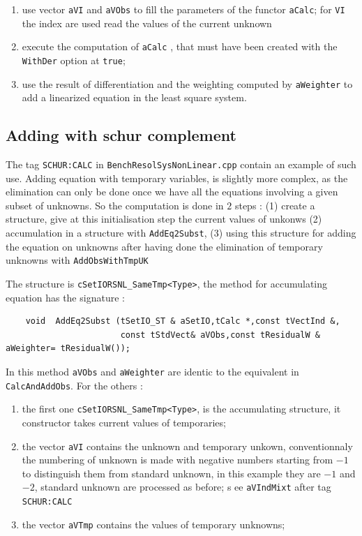 \begin{enumerate}
   \item  use  vector {\tt aVI} and {\tt aVObs}  to fill the parameters
          of the functor {\tt aCalc}; for {\tt VI} the index are used read the 
          values of the current unknown

   \item  execute the computation of {\tt aCalc} , that must  have been created
          with the {\tt WithDer} option at {\tt true};

   \item  use the result of differentiation and the weighting computed by {\tt aWeighter}
          to add a linearized equation in the least square system.
\end{enumerate}



\subsection{Adding with schur complement}

The tag  {\tt  SCHUR:CALC} in {\tt BenchResolSysNonLinear.cpp} contain an example of such use.
Adding equation with temporary variables, is slightly more complex, as the elimination
can only be done once we have all the equations involving a given subset of unknowns.
So the computation is done in $2$ steps : (1) create a structure, give at this initialisation
step  the current values of unkonws (2) accumulation in a structure 
with {\tt AddEq2Subst}, (3) using this structure
for adding the equation on unknowns after having done the elimination of temporary unknowns with
{\tt  AddObsWithTmpUK}

The structure is {\tt cSetIORSNL\_SameTmp<Type>}, the method for accumulating 
equation has the signature :

\begin{lstlisting}
    void  AddEq2Subst (tSetIO_ST & aSetIO,tCalc *,const tVectInd &,
                       const tStdVect& aVObs,const tResidualW & aWeighter= tResidualW());
\end{lstlisting}

In this method {\tt aVObs} and {\tt aWeighter} are identic to the equivalent in
{\tt CalcAndAddObs}. For the others :

\begin{enumerate}
   \item the first one {\tt cSetIORSNL\_SameTmp<Type>}, is the accumulating structure, it
	   constructor takes current values of temporaries;

   \item  the vector {\tt aVI} contains the  unknown and temporary unkown,  
	   conventionnaly the numbering of unknown is made with negative numbers starting from
           $-1$ to distinguish them from standard unknown, in this example they are $-1$ and $-2$,
           standard unknown are processed as before; 
         s  ee {\tt aVIndMixt} after tag {\tt SCHUR:CALC}

   \item  the vector {\tt aVTmp} contains the  values of temporary unknowns;
\end{enumerate}

